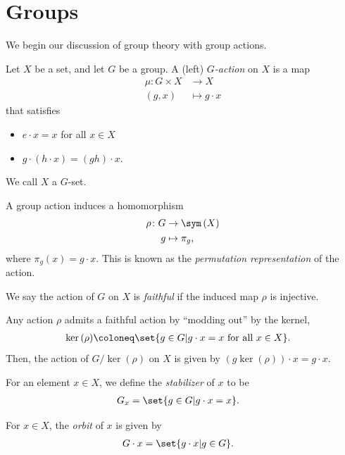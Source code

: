\documentclass[10pt]{mypackage}
\begin{document}
\section{Groups}%
We begin our discussion of group theory with group actions.
\begin{definition}
  Let $X$ be a set, and let $G$ be a group. A (left) \textit{$G$-action} on $X$ is a map
  \begin{align*}
    \mu\colon G\times X &\rightarrow X\\
    \left( g,x \right) &\mapsto g\cdot x
  \end{align*}
  that satisfies
  \begin{itemize}
    \item $e\cdot x = x$ for all $x\in X$
    \item $g\cdot \left( h\cdot x \right) = \left( gh \right)\cdot x$.
  \end{itemize}
  We call $X$ a $G$-set.
\end{definition}
\begin{definition}
  A group action induces a homomorphism
  \begin{align*}
    \rho\colon G&\rightarrow \sym\left( X \right)\\
    g &\mapsto \pi_g,
  \end{align*}
  where $\pi_g\left( x \right) = g\cdot x$. This is known as the \textit{permutation representation} of the action.
\end{definition}
\begin{definition}
  We say the action of $G$ on $X$ is \textit{faithful} if the induced map $\rho$ is injective.
\end{definition}
\begin{remark}
  Any action $\rho$ admits a faithful action by ``modding out'' by the kernel,
  \begin{align*}
    \ker\left( \rho \right) &\coloneq \set{g\in G | g\cdot x = x\text{ for all }x\in X}.
  \end{align*}
  Then, the action of $G/\ker\left( \rho \right)$ on $X$ is given by $\left( g\ker\left( \rho \right) \right)\cdot x = g\cdot x$.
\end{remark}
\begin{definition}
  For an element $x\in X$, we define the \textit{stabilizer} of $x$ to be
  \begin{align*}
    G_x &= \set{g\in G | g\cdot x = x}.
  \end{align*}
\end{definition}
\begin{definition}
  For $x\in X$, the \textit{orbit} of $x$ is given by
  \begin{align*}
    G\cdot x &= \set{g\cdot x | g\in G}.
  \end{align*}
\end{definition}
\end{document}
